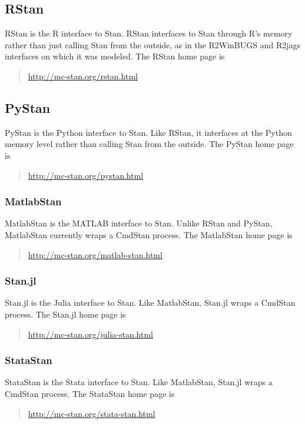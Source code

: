 \subsection{RStan}

RStan is the R interface to Stan.  RStan interfaces to Stan through
R's memory rather than just calling Stan from the outside, as in the
R2WinBUGS and R2jags interfaces on which it was modeled.  The RStan
home page is
%
\begin{quote}
\url{http://mc-stan.org/rstan.html}
\end{quote}

\subsection{PyStan}

PyStan is the Python interface to Stan.  Like RStan, it interfaces at
the Python memory level rather than calling Stan from the outside.
The PyStan home page is
%
\begin{quote}
\url{http://mc-stan.org/pystan.html}
\end{quote}

\subsubsection{MatlabStan}

MatlabStan is the MATLAB interface to Stan.  Unlike RStan and PyStan,
MatlabStan currently wraps a CmdStan process.  The
MatlabStan home page is
%
\begin{quote}
\url{http://mc-stan.org/matlab-stan.html}
\end{quote}
%

\subsubsection{Stan.jl}

Stan.jl is the Julia interface to Stan.  Like MatlabStan, Stan.jl
wraps a CmdStan process.  The Stan.jl home page is
%
\begin{quote}
\url{http://mc-stan.org/julia-stan.html}
\end{quote}
%

\subsubsection{StataStan}

StataStan is the Stata interface to Stan.  Like MatlabStan, Stan.jl
wraps a CmdStan process.  The StataStan home page is
%
\begin{quote}
\url{http://mc-stan.org/stata-stan.html}
\end{quote}


